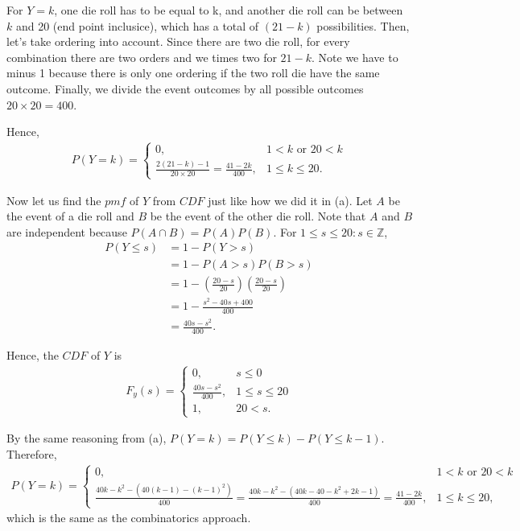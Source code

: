 \documentclass{article}
\begin{document}
\begin{enumerate}[label={(\alph*)}]
    For $Y=k$, one die roll has to be equal to k, and another die roll can be between $k$ and 20 (end point inclusice), which has a total of $(21-k)$ possibilities.
    Then, let's take ordering into account. Since there are two die roll, for every combination there are two orders and we times two for $21-k$.
    Note we have to minus 1 because there is only one ordering if the two roll die have the same outcome. 
    Finally, we divide the event outcomes by all possible outcomes $20 \times 20 = 400$.

    Hence, 
    \begin{align}
        P(Y=k)=
        \begin{cases}
            0, & 1<k \text{ or } 20<k \\
            \frac{2(21-k)-1}{20 \times 20}=\frac{41-2k}{400}, & 1 \le k \le 20.
        \end{cases}
    \end{align}

    Now let us find the $pmf$ of $Y$ from $CDF$ just like how we did it in (a). 
    Let $A$ be the event of a die roll and $B$ be the event of the other die roll. Note that $A$ and $B$ are independent because $P(A \cap B)=P(A)P(B)$. 
    For $1 \le s \le 20: s \in \mathbb{Z}$,
    \begin{align}
        P(Y \le s) & = 1-P(Y > s) \\
        & = 1-P(A>s)P(B>s) \\
        & = 1-(\frac{20-s}{20})(\frac{20-s}{20}) \\
        & = 1-\frac{s^2-40s+400}{400} \\
        & = \frac{40s-s^2}{400}.
    \end{align}

    Hence, the $CDF$ of $Y$ is 
    \begin{align}
        F_y(s) = 
            \begin{cases}
                0, & s \le 0 \\
                \frac{40s-s^2}{400}, & 1 \le s \le 20 \\
                1, & 20 < s.
            \end{cases}  
    \end{align}

    By the same reasoning from (a), $P(Y=k)=P(Y \le k)-P(Y \le k-1)$.
    Therefore, 
    \begin{align}
        P(Y=k)=
        \begin{cases}
            0, & 1<k \text{ or } 20<k \\
            \frac{40k-k^2-\left(40(k-1)-(k-1)^2\right)}{400}=\frac{40k-k^2-(40k-40-k^2+2k-1)}{400}=\frac{41-2k}{400}, & 1 \le k \le 20,
        \end{cases}
    \end{align}
    which is the same as the combinatorics approach.
\end{enumerate}
\end{document}
